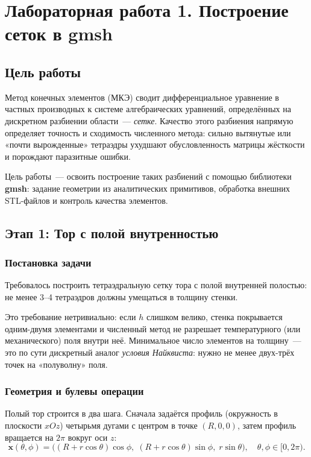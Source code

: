 \section{Лабораторная работа \textnumero{}1. Построение сеток в gmsh}

\subsection{Цель работы}

Метод конечных элементов (МКЭ) сводит дифференциальное уравнение
в частных производных к системе алгебраических уравнений, определённых
на дискретном разбиении области~--- \textit{сетке}. Качество этого
разбиения напрямую определяет точность и сходимость численного метода:
сильно вытянутые или «почти вырожденные» тетраэдры ухудшают обусловленность
матрицы жёсткости и порождают паразитные ошибки.

Цель работы~--- освоить построение таких разбиений с помощью библиотеки
\textbf{gmsh}: задание геометрии из аналитических примитивов, обработка
внешних STL-файлов и контроль качества элементов.

\subsection{Этап 1: Тор с полой внутренностью}

\subsubsection{Постановка задачи}

Требовалось построить тетраэдральную сетку тора с полой внутренней
полостью: не менее 3--4 тетраэдров должны умещаться в толщину стенки.

Это требование нетривиально: если $h$ слишком велико, стенка
покрывается одним-двумя элементами и численный метод не разрешает
температурного (или механического) поля внутри неё. Минимальное число
элементов на толщину~--- это по сути дискретный аналог \textit{условия
Найквиста}: нужно не менее двух-трёх точек на «полуволну» поля.

\subsubsection{Геометрия и булевы операции}

Полый тор строится в два шага. Сначала задаётся профиль (окружность
в плоскости $xOz$) четырьмя дугами с центром в точке $(R, 0, 0)$,
затем профиль вращается на $2\pi$ вокруг оси $z$:
\begin{equation}
  \mathbf{x}(\theta, \phi) =
  \bigl((R + r\cos\theta)\cos\phi,\;
         (R + r\cos\theta)\sin\phi,\;
         r\sin\theta\bigr),
  \quad \theta,\phi \in [0, 2\pi).
\end{equation}

